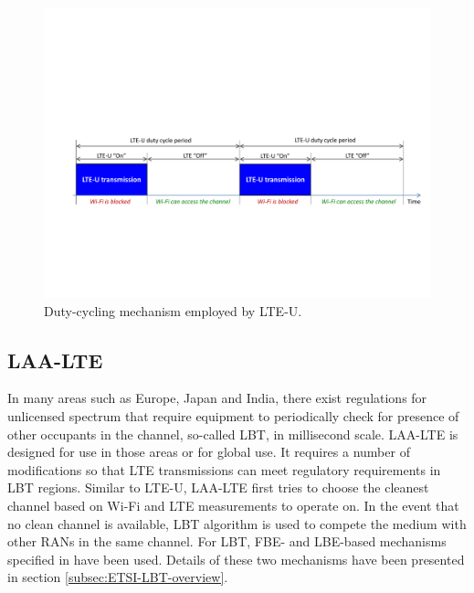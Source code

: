 \documentclass[journal,draftclsnofoot,12pt,onecolumn]{IEEEtran}
\begin{document}
\begin{figure}[!t]
\centering
\includegraphics[width=0.95\columnwidth]{figures2/LTE-U}
\caption{Duty-cycling mechanism employed by LTE-U.}
\label{figs:LTE-U}
\end{figure}

\subsection{LAA-LTE}
\label{subsection:LAA-LTE}

\noindent In many areas such as Europe, Japan and India, there exist regulations for unlicensed spectrum that require equipment to periodically check for presence of other occupants in the channel, so-called LBT, in millisecond scale. LAA-LTE is designed for use in those areas or for global use. It requires a number of modifications so that LTE transmissions can meet regulatory requirements in LBT regions. Similar to LTE-U, LAA-LTE first tries to choose the cleanest channel based on Wi-Fi and LTE measurements to operate on. In the event that no clean channel is available, LBT algorithm is used to compete the medium with other RANs in the same channel. For LBT, FBE- and LBE-based mechanisms specified in \cite{LBT-ETSI-2014} have been used. Details of these two mechanisms have been presented in section \ref{subsec:ETSI-LBT-overview}.
\end{document}
